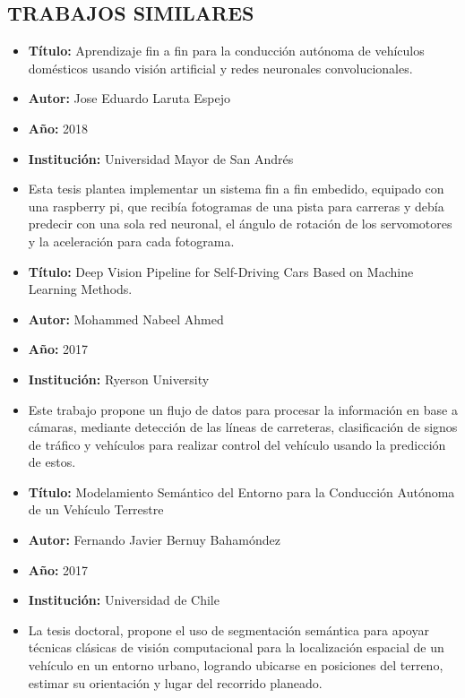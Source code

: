 \subsection{TRABAJOS SIMILARES}

\begin{itemize}[nosep]
    \item[] \textbf{Título:} Aprendizaje fin a fin para la conducción autónoma de vehículos domésticos usando visión artificial y redes neuronales convolucionales.
    \item[] \textbf{Autor:} Jose Eduardo Laruta Espejo
    \item[] \textbf{Año:} 2018
    \item[] \textbf{Institución:} Universidad Mayor de San Andrés
    \item[] Esta tesis plantea implementar un sistema fin a fin embedido, equipado con una raspberry pi, que recibía fotogramas de una pista para carreras y debía predecir con una sola red neuronal, el ángulo de rotación de los servomotores y la aceleración para cada fotograma.
\end{itemize}

\begin{itemize}[nosep]
    \item[] \textbf{Título:} Deep Vision Pipeline for Self-Driving Cars Based on Machine Learning Methods.
    \item[] \textbf{Autor:} Mohammed Nabeel Ahmed
    \item[] \textbf{Año:} 2017
    \item[] \textbf{Institución:} Ryerson University
    \item[] Este trabajo propone un flujo de datos para procesar la información en base a cámaras, mediante detección de las líneas de carreteras, clasificación de signos de tráfico y vehículos para realizar control del vehículo usando la predicción de estos.
\end{itemize}

\begin{itemize}[nosep]
    \item[] \textbf{Título:} Modelamiento Semántico del Entorno para la Conducción Autónoma de un Vehículo Terrestre
    \item[] \textbf{Autor:} Fernando Javier Bernuy Bahamóndez
    \item[] \textbf{Año:} 2017
    \item[] \textbf{Institución:} Universidad de Chile
    \item[] La tesis doctoral, propone el uso de segmentación semántica para apoyar técnicas clásicas de visión computacional para la localización espacial de un vehículo en un entorno urbano, logrando ubicarse en posiciones del terreno, estimar su orientación y lugar del recorrido planeado.
\end{itemize}
